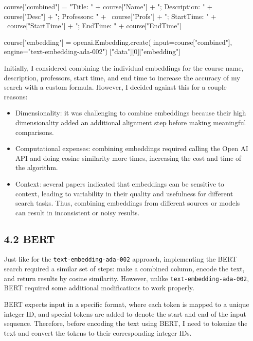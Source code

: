 \documentclass[
	a4paper, %
	10pt, %
	unnumberedsections, %
	twoside, %
]{LTJournalArticle}
\begin{document}
\begin{python}
	course["combined"] = "Title: " + 
	course["Name"] + "; Description: " + 
	course["Desc"] + "; Professors: " + \
	course["Profs"] + "; StartTime: " + \
	course["StartTime"] + "; EndTime: " + 
	course["EndTime"]

	course["embedding"] = 
	openai.Embedding.create(
	input=course["combined"], 
	engine="text-embedding-ada-002")
	["data"][0]["embedding"]
\end{python}

Initially, I considered combining the individual embeddings for the course name, description, professors, start time, and end time to increase the accuracy of my search with a custom formula. However, I decided against this for a couple reasons: 
\begin{itemize}
	\item Dimensionality: it was challenging to combine embeddings because their high dimensionality added an additional alignment step before making meaningful comparisons.
	\item Computational expenses: combining embeddings required calling the Open AI API and doing cosine similarity more times, increasing the cost and time of the algorithm. 
	\item Context: several papers indicated that embeddings can be sensitive to context, leading to variability in their quality and usefulness for different search tasks. Thus, combining embeddings from different sources or models can result in inconsistent or noisy results.
\end{itemize}


\subsection{4.2 BERT}

Just like for the \texttt{text-embedding-ada-002} approach, implementing the BERT search required a similar set of steps: make a combined column, encode the text, and return results by cosine similarity. However, unlike  \texttt{text-embedding-ada-002}, BERT required some additional modifications to work properly. 

BERT expects input in a specific format, where each token is mapped to a unique integer ID, and special tokens are added to denote the start and end of the input sequence. Therefore, before encoding the text using BERT, I need to tokenize the text and convert the tokens to their corresponding integer IDs.
\end{document}
